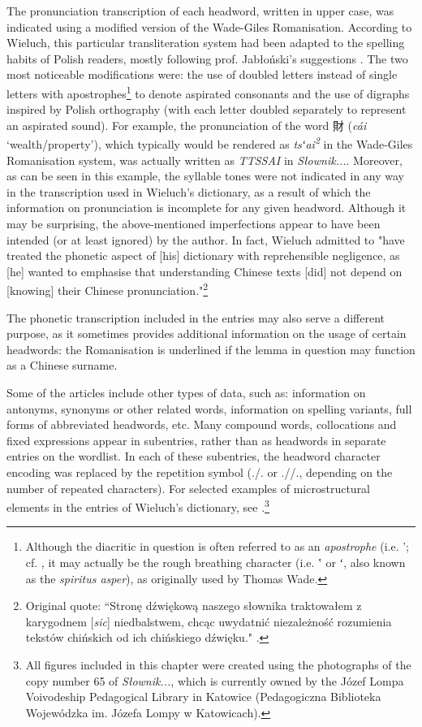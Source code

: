 \documentclass[output=paper,colorlinks,citecolor=brown,arabicfont,chinesefont]{langscibook}
\begin{document}
The pronunciation transcription of each headword, written in upper case, was indicated using a modified version of the Wade-Giles Romanisation. According to Wieluch, this particular transliteration system had been adapted to the spelling habits of Polish readers, mostly following prof. Jabłoński's suggestions \citep[11\textsubscript{p}]{Wieluch1936}. The two most noticeable modifications were: the use of doubled letters instead of single letters with apostrophes\footnote{Although the diacritic in question is often referred to as an \emph{apostrophe} (i.e. '; cf. \citep[11\textsubscript{p}]{Wieluch1936}, it may actually be the rough breathing character (i.e. ʽ or ʻ, also known as the \emph{spiritus asper}), as originally used by Thomas Wade.
} to denote aspirated consonants and the use of digraphs inspired by Polish orthography (with each letter doubled separately to represent an aspirated sound). For example, the pronunciation of the word {\cn 財} (\emph{cái} ‘wealth/property’), which typically would be rendered as \emph{tsʻai\textsuperscript{2}} in the Wade-Giles Romanisation system, was actually written as \emph{TTSSAI} in \emph{Słownik...}. Moreover, as can be seen in this example, the syllable tones were not indicated in any way in the transcription used in Wieluch's dictionary, as a result of which the information on pronunciation is incomplete for any given headword. Although it may be surprising, the above-mentioned imperfections appear to have been intended (or at least ignored) by the author. In fact, Wieluch admitted to "have treated the phonetic aspect of [his] dictionary with reprehensible negligence, as [he] wanted to emphasise that understanding Chinese texts [did] not depend on [knowing] their Chinese pronunciation."\footnote{Original quote: “Stronę dźwiękową naszego słownika traktowałem z karygodnem [\emph{sic}] niedbalstwem, chcąc uwydatnić niezależność rozumienia tekstów chińskich od ich chińskiego dźwięku." \citep[11\textsubscript{p}]{Wieluch1936}.}

The phonetic transcription included in the entries may also serve a different purpose, as it sometimes provides additional information on the usage of certain headwords: the Romanisation is underlined if the lemma in question may function as a Chinese surname.

\largerpage
Some of the articles include other types of data, such as: information on antonyms, synonyms or other related words, information on spelling variants, full forms of abbreviated headwords, etc. Many compound words, collocations and fixed expressions appear in subentries, rather than as headwords in separate entries on the wordlist. In each of these subentries, the headword character encoding was replaced by the repetition symbol (./. or .//., depending on the number of repeated characters). For selected examples of microstructural elements in the entries of Wieluch's dictionary, see .\footnote{All figures included in this chapter were created using the photographs of the copy number 65 of \emph{Słownik...}, which is currently owned by the Józef Lompa Voivodeship Pedagogical Library in Katowice (Pedagogiczna Biblioteka Wojewódzka im. Józefa Lompy w Katowicach).} 
\end{document}
